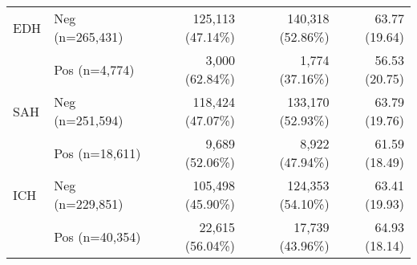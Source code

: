\begin{table}[!htbp]
\begin{tabular}{ll|rr|r}
\midrule
          EDH & Neg (n=265,431) & 125,113 (47.14\%) & 140,318 (52.86\%) & 63.77 (19.64) \\
              & Pos (n=4,774) &   3,000 (62.84\%) &   1,774 (37.16\%) & 56.53 (20.75) \\
\midrule
          SAH & Neg (n=251,594) & 118,424 (47.07\%) & 133,170 (52.93\%) & 63.79 (19.76) \\
              & Pos (n=18,611) &   9,689 (52.06\%) &   8,922 (47.94\%) & 61.59 (18.49) \\
\midrule
          ICH & Neg (n=229,851) & 105,498 (45.90\%) & 124,353 (54.10\%) & 63.41 (19.93) \\
              & Pos (n=40,354) &  22,615 (56.04\%) &  17,739 (43.96\%) & 64.93 (18.14) \\
\bottomrule
\end{tabular}
\end{table}


